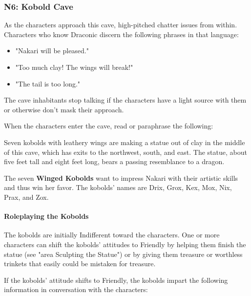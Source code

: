 \documentclass[letterpaper, 11pt, twocolumn]{dndbook}
\begin{document}
\subsubsection{N6: Kobold Cave}

As the characters approach this cave, high-pitched chatter issues from within. Characters who know Draconic discern the following phrases in that language:

\begin{itemize}
\item "Nakari will be pleased."
\item "Too much clay! The wings will break!"
\item "The tail is too long."
\end{itemize}

The cave inhabitants stop talking if the characters have a light source with them or otherwise don't mask their approach.

When the characters enter the cave, read or paraphrase the following:

\begin{DndReadAloud}
Seven kobolds with leathery wings are making a statue out of clay in the middle of this cave, which has exits to the northwest, south, and east. The statue, about five feet tall and eight feet long, bears a passing resemblance to a dragon.
\end{DndReadAloud}

The seven \textbf{Winged Kobolds} want to impress Nakari with their artistic skills and thus win her favor. The kobolds' names are Drix, Grox, Kex, Mox, Nix, Prax, and Zox.

\paragraph{Roleplaying the Kobolds}

The kobolds are initially Indifferent toward the characters. One or more characters can shift the kobolds' attitudes to Friendly by helping them finish the statue (see "area Sculpting the Statue") or by giving them treasure or worthless trinkets that easily could be mistaken for treasure.

If the kobolds' attitude shifts to Friendly, the kobolds impart the following information in conversation with the characters:
\end{document}
